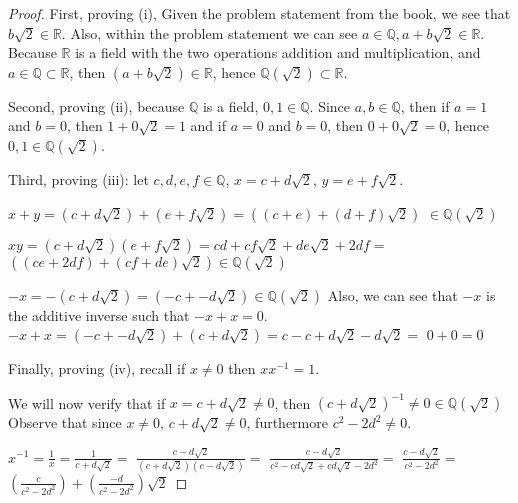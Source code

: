 \documentclass[a4paper]{article}
\begin{document}
\begin{myparindent}{0pt}
\begin{proof}
  First, proving (i), Given the problem statement from the book, we see that $b \sqrt{2} \in \mathbb{R}$.
  Also, within the problem statement we can see $a \in \mathbb{Q}, a + b \sqrt{2} \in \mathbb{R}$.
  Because $\mathbb{R}$ is a field with the two operations addition and multiplication,
  and $a \in \mathbb{Q} \subset \mathbb{R}$, then $(a + b\sqrt{2}) \in \mathbb{R}$,
  hence $\mathbb{Q}(\sqrt{2}) \subset \mathbb{R}$. \newline

  Second, proving (ii), because $\mathbb{Q}$ is a field, $0, 1 \in \mathbb{Q}$.
  Since $a, b \in \mathbb{Q}$, then if $a = 1$ and $b = 0$, then
  $1 + 0 \sqrt{2} = 1$ and if $a = 0$ and $b = 0$, then $0 + 0 \sqrt{2} = 0$,
  hence $0, 1 \in \mathbb{Q}(\sqrt{2})$. \newline

  Third, proving (iii): let $c, d, e, f \in \mathbb{Q}$, $x = c + d \sqrt{2}$,
  $y = e + f \sqrt{2}$. \newline

    $x + y = (c + d \sqrt{2}) + (e + f \sqrt{2}) = ((c + e) + (d + f) \sqrt{2})$
    $\in \mathbb{Q}(\sqrt{2})$ \newline

    $xy = (c + d \sqrt{2})(e + f \sqrt{2}) = cd + cf \sqrt{2} + de \sqrt{2} + 2df =$ \newline
    $((ce + 2df) + (cf + de) \sqrt{2}) \in \mathbb{Q}(\sqrt{2})$ \newline

    $-x = -(c + d \sqrt{2}) = (-c + -d \sqrt{2}) \in \mathbb{Q}(\sqrt{2})$ \newline
    Also, we can see that $-x$ is the additive inverse such that $-x + x = 0$. \newline
    $-x + x = (-c + -d \sqrt{2}) + (c + d \sqrt{2}) = c - c + d \sqrt{2} - d \sqrt{2} =$
    $0 + 0 = 0$ \newline

    Finally, proving (iv), recall if $x \ne 0$ then $xx^{-1} = 1$. \newline

    We will now verify that if $x = c + d \sqrt{2} \ne 0$, then
    $(c + d \sqrt{2})^{-1} \ne 0 \in \mathbb{Q}(\sqrt{2})$
    Observe that since $x \ne 0$, $c + d \sqrt{2} \ne 0$, furthermore
    $c^2 - 2d^2 \ne 0$. \newline

    $x^{-1} = \frac{1}{x} = \frac{1}{c + d \sqrt{2}} = $
    $\frac{c - d \sqrt{2}}{(c + d \sqrt{2})(c - d \sqrt{2})} =$
    $\frac{c - d \sqrt{2}}{c^2 - cd \sqrt{2} + cd \sqrt{2} - 2d^2} =$
    $\frac{c - d \sqrt{2}}{c^2 - 2d^2} =$ \newline
    $(\frac{c}{c^2 - 2 d^2}) + (\frac{-d}{c^2 - 2d^2}) \sqrt{2}$ \newline


\end{proof}
\end{myparindent}
\end{document}
